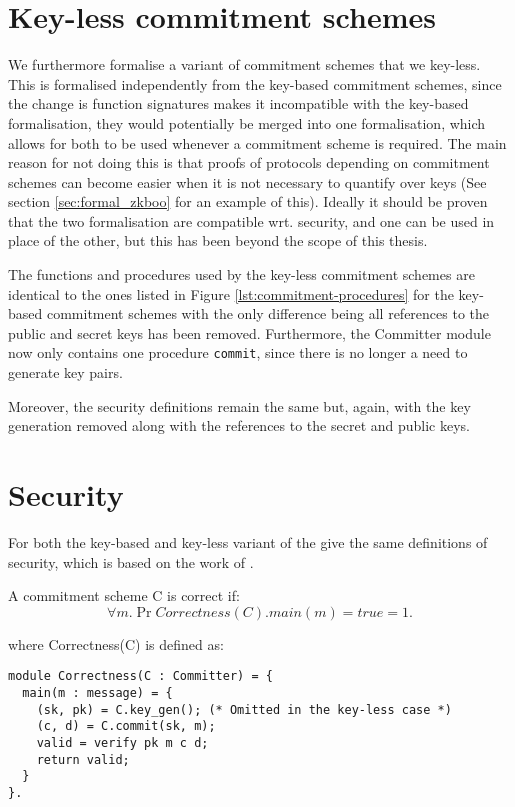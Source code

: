 \section{Key-less commitment schemes}
\label{sec:commitment:key-less}
We furthermore formalise a variant of commitment schemes that we key-less. This
is formalised independently from the key-based commitment schemes, since the
change is function signatures makes it incompatible with the key-based
formalisation, they would potentially be merged into one formalisation, which
allows for both to be used whenever a commitment scheme is required. The main
reason for not doing this is that proofs of protocols depending on commitment
schemes can become easier when it is not necessary to quantify over keys (See
section \ref{sec:formal_zkboo} for an example of this). Ideally it should be
proven that the two formalisation are compatible wrt. security, and one can be
used in place of the other, but this has been beyond the scope of this thesis.

The functions and procedures used by the key-less commitment schemes are
identical to the ones listed in Figure \ref{lst:commitment-procedures} for the
key-based commitment schemes with the only difference being all references to
the public and secret keys has been removed. Furthermore, the Committer module
now only contains one procedure \texttt{commit}, since there is no longer a need
to generate key pairs.

Moreover, the security definitions remain the same but, again, with the key
generation removed along with the references to the secret and public keys.

\section{Security}
\label{sec:commitment:sec}
For both the key-based and key-less variant of the give the same definitions of security, which is based on the work of \citet{DBLP:journals/corr/MetereD17}.

\begin{definition}[Correctness]
  \label{def:commitment:correctness}
  A commitment scheme C is correct if:
  \[
    \forall m. \Pr{ Correctness(C).main(m) = true } = 1.
  \]

  where Correctness(C) is defined as:

\begin{lstlisting}
module Correctness(C : Committer) = {
  main(m : message) = {
    (sk, pk) = C.key_gen(); (* Omitted in the key-less case *)
    (c, d) = C.commit(sk, m);
    valid = verify pk m c d;
    return valid;
  }
}.
\end{lstlisting}


\end{definition}

